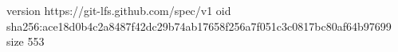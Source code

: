 version https://git-lfs.github.com/spec/v1
oid sha256:ace18d0b4c2a8487f42dc29b74ab17658f256a7f051c3c0817bc80af64b97699
size 553
